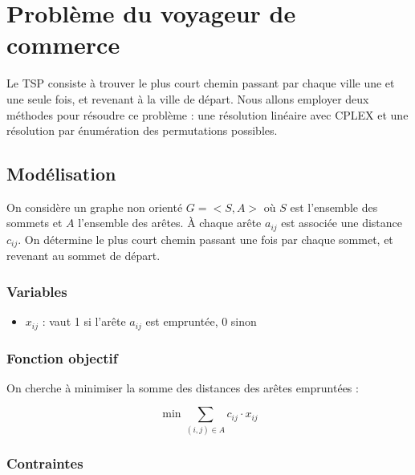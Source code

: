 \chapter{Problème du voyageur de commerce}
\label{chap:tsp}

Le \ac{TSP} consiste à trouver le plus court chemin passant par chaque ville une et une seule fois, et revenant à la ville de départ. Nous allons employer deux méthodes pour résoudre ce problème : une résolution linéaire avec CPLEX \cite{wiki_tsp} et une résolution par énumération des permutations possibles.

\section{Modélisation}
\label{sec:tsp_model}
On considère un graphe non orienté $G=<S,A>$ où $S$ est l'ensemble des sommets et $A$ l'ensemble des arêtes. À chaque arête $a_{ij}$ est associée une distance $c_{ij}$. On détermine le plus court chemin passant une fois par chaque sommet, et revenant au sommet de départ.

\subsection{Variables}

\begin{itemize}
    \item $x_{ij}$ : vaut 1 si l'arête $a_{ij}$ est empruntée, 0 sinon
\end{itemize}

\subsection{Fonction objectif}

On cherche à minimiser la somme des distances des arêtes empruntées :

\begin{equation}
    \min \sum_{(i,j) \in A} c_{ij} \cdot x_{ij}
\end{equation}

\subsection{Contraintes}

